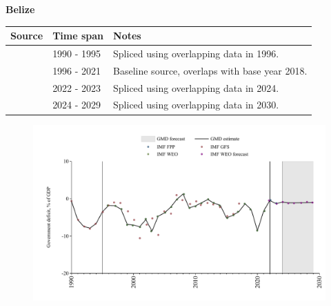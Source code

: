 \documentclass[12pt,a4paper,landscape]{article}
\begin{document}
\begin{adjustbox}{max totalsize={\paperwidth}{\paperheight},center}
\begin{minipage}[t][\textheight][t]{\textwidth}
\begin{figure}[H]
\end{figure}
\end{minipage}
\end{adjustbox}
\begin{adjustbox}{max totalsize={\paperwidth}{\paperheight},center}
\begin{minipage}[t][\textheight][t]{\textwidth}
\vspace*{0.5cm}
{}
\begin{center}
{\Large\bfseries Belize}
\end{center}
\vspace{0.5cm}
\begin{table}[H]
\centering
\small
\begin{tabular}{|l|l|l|}
\hline
\textbf{Source} & \textbf{Time span} & \textbf{Notes} \\
\hline
\rowcolor{white}\cite{IMF_GFS}& 1990 - 1995 &Spliced using overlapping data in 1996.\\
\rowcolor{lightgray}\cite{IMF_WEO}& 1996 - 2021 &Baseline source, overlaps with base year 2018.\\
\rowcolor{white}\cite{IMF_FPP}& 2022 - 2023 &Spliced using overlapping data in 2024.\\
\rowcolor{lightgray}\cite{IMF_WEO_forecast}& 2024 - 2029 &Spliced using overlapping data in 2030.\\
\hline
\end{tabular}
\end{table}
\begin{figure}[H]
\centering
\includegraphics[width=\textwidth,height=0.6\textheight,keepaspectratio]{graphs/BLZ_govdef_GDP.pdf}
\end{figure}
\end{minipage}
\end{adjustbox}
\end{document}

